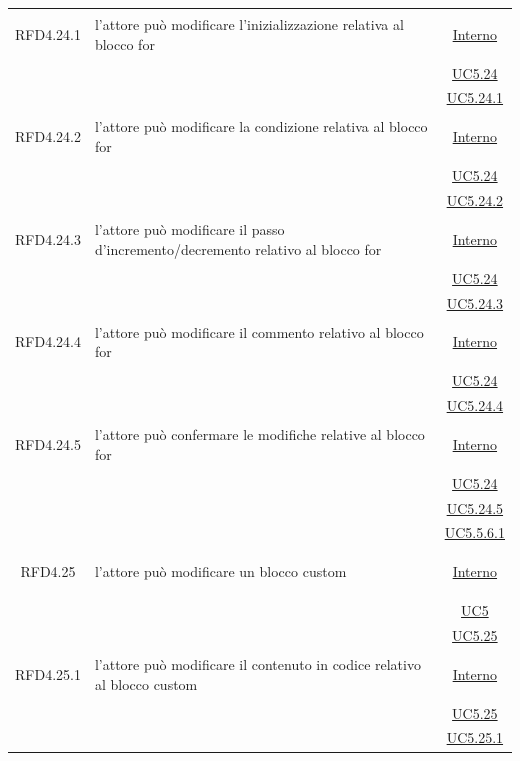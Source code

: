 \begin{longtable}{|c|>{\centering}m{7cm}|c|}
\hypertarget{RFD4.24.1}{RFD4.24.1} & l'attore può modificare l'inizializzazione relativa al blocco for &  \hyperlink{Interno}{Interno}\\
& &\hyperref[UC5.24]{UC5.24}\\
& &\hyperref[UC5.24.1]{UC5.24.1}\\ \hline

\hypertarget{RFD4.24.2}{RFD4.24.2} & l'attore può modificare la condizione relativa al blocco for &  \hyperlink{Interno}{Interno}\\
& &\hyperref[UC5.24]{UC5.24}\\
& &\hyperref[UC5.24.2]{UC5.24.2}\\ \hline

\hypertarget{RFD4.24.3}{RFD4.24.3} & l'attore può modificare il passo d'incremento/decremento relativo al blocco for &  \hyperlink{Interno}{Interno}\\
& &\hyperref[UC5.24]{UC5.24}\\
& &\hyperref[UC5.24.3]{UC5.24.3}\\ \hline

\hypertarget{RFD4.24.4}{RFD4.24.4} & l'attore può modificare il commento relativo al blocco for &  \hyperlink{Interno}{Interno}\\
& &\hyperref[UC5.24]{UC5.24}\\
& &\hyperref[UC5.24.4]{UC5.24.4}\\ \hline

\hypertarget{RFD4.24.5}{RFD4.24.5} & l'attore può confermare le modifiche relative al blocco for &  \hyperlink{Interno}{Interno}\\
& &\hyperref[UC5.24]{UC5.24}\\
& &\hyperref[UC5.24.5]{UC5.24.5}\\ 
& &\hyperref[UC5.5.6.1]{UC5.5.6.1}\\ \hline

\hypertarget{RFD4.25}{RFD4.25} & l'attore può modificare un blocco custom &  \hyperlink{Interno}{Interno}\\
& &\hyperref[UC5]{UC5}\\
& &\hyperref[UC5.25]{UC5.25}\\ \hline

\hypertarget{RFD4.25.1}{RFD4.25.1} & l'attore può modificare il contenuto in codice relativo al blocco custom &  \hyperlink{Interno}{Interno}\\
& &\hyperref[UC5.25]{UC5.25}\\
& &\hyperref[UC5.25.1]{UC5.25.1}\\ \hline


\end{longtable}
